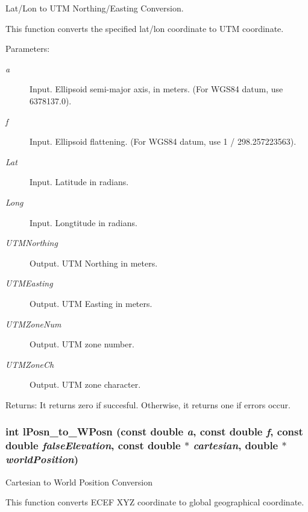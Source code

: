 Lat/Lon to UTM Northing/Easting Conversion. 

This function converts the specified lat/lon coordinate to UTM coordinate.

\begin{Desc}
\item[Parameters:]
\begin{description}
\item[{\em a}]Input. Ellipsoid semi-major axis, in meters. (For WGS84 datum, use 6378137.0). \item[{\em f}]Input. Ellipsoid flattening. (For WGS84 datum, use 1 / 298.257223563). \item[{\em Lat}]Input. Latitude in radians. \item[{\em Long}]Input. Longtitude in radians. \item[{\em UTMNorthing}]Output. UTM Northing in meters. \item[{\em UTMEasting}]Output. UTM Easting in meters. \item[{\em UTMZoneNum}]Output. UTM zone number. \item[{\em UTMZoneCh}]Output. UTM zone character.\end{description}
\end{Desc}
\begin{Desc}
\item[Returns:]It returns zero if succesful. Otherwise, it returns one if errors occur. \end{Desc}
\hypertarget{group__Coordinate_g79ace4a7c8d0331aa300fdb5a68e16ec}{
\subsubsection[lPosn\_\-to\_\-WPosn]{\setlength{\rightskip}{0pt plus 5cm}int lPosn\_\-to\_\-WPosn (const double {\em a}, \/  const double {\em f}, \/  const double {\em falseElevation}, \/  const double $\ast$ {\em cartesian}, \/  double $\ast$ {\em worldPosition})}}
\label{group__Coordinate_g79ace4a7c8d0331aa300fdb5a68e16ec}


Cartesian to World Position Conversion 

This function converts ECEF XYZ coordinate to global geographical coordinate.

